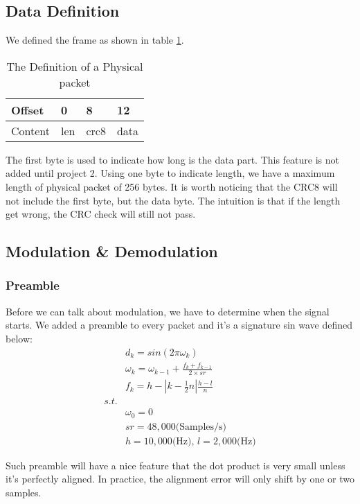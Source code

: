 \documentclass[conference,compsoc]{IEEEtran}
\begin{document}
	\subsection{Data Definition}
		We defined the frame as shown in table \ref{PhyLayer_dataDef}.
		\begin{table}[ht]
		\begin{center}\begin{tabular}{m{1cm}m{1cm}m{1cm}m{1cm}}\label{PhyLayer_dataDef}
		Offset                        & 0                        & 8                        & 12                        \\ \hline
		\multicolumn{1}{|l|}{Content} & \multicolumn{1}{l|}{len} & \multicolumn{1}{l|}{crc8} & \multicolumn{1}{l|}{data} \\ \hline
		\end{tabular}\end{center}
		\caption{The Definition of a Physical packet}
		\end{table}
		\par
		The first byte is used to indicate how long is the data part. 
		This feature is not added until project 2. 
		Using one byte to indicate length, we have a maximum length of physical packet of 256 bytes.
		It is worth noticing that the CRC8 will not include the first byte, but the data byte.
		The intuition is that if the length get wrong, the CRC check will still not pass.

	\subsection{Modulation \& Demodulation}
		\subsubsection{Preamble} 
			Before we can talk about modulation, we have to determine when the signal starts. We added a preamble to every packet and it's a signature sin wave defined below:
			\begin{equation*}\begin{aligned}
				& d_k = sin(2\pi\omega_k) \\
				& \omega_k = \omega_{k-1} + \frac{f_k + f_{k-1}}{2\times sr} \\
				& f_k = h - |k-\frac{1}{2}n|\frac{h-l}{n} \\
				s.t. \\
				& \omega_0 = 0 \\
				& sr = 48,000 \text{(Samples/s)}\\
				& h = 10,000 \text{(Hz), } l = 2,000 \text{(Hz)}
			\end{aligned}\end{equation*}
			\par
			Such preamble will have a nice feature that the dot product is very small unless it's perfectly aligned. 
			In practice, the alignment error will only shift by one or two samples.
\end{document}
